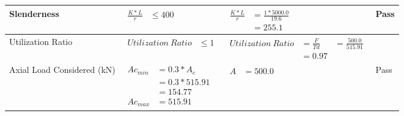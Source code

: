 \documentclass{article}%
\begin{document}
\begin{longtable}{|p{2.5cm}|p{4.5cm}|p{8cm}|p{1cm}|}
\hline%
Slenderness&$\begin{aligned}\frac{K * L}{r} &\leq 400\end{aligned}$&$\begin{aligned}\frac{K * L}{r} &= \frac{1*5000.0}{19.6}\\ &= 255.1\end{aligned}$&Pass\\%
\hline%
Utilization Ratio&$\begin{aligned} Utilization~Ratio &\leq 1 \end{aligned}$&$\begin{aligned} Utilization~Ratio &= \frac{F}{Td}&=\frac{500.0}{515.91}\\ &= 0.97\end{aligned}$&\\%
\hline%
Axial Load Considered (kN)&$\begin{aligned} Ac_{min} &= 0.3 * A_c\\ &= 0.3 *515.91\\ &=154.77\\ Ac_{max} &=515.91\end{aligned}$&$\begin{aligned} A &=500.0\end{aligned}$&Pass\\%
\hline%
\end{longtable}

%
\newpage%
\end{document}
